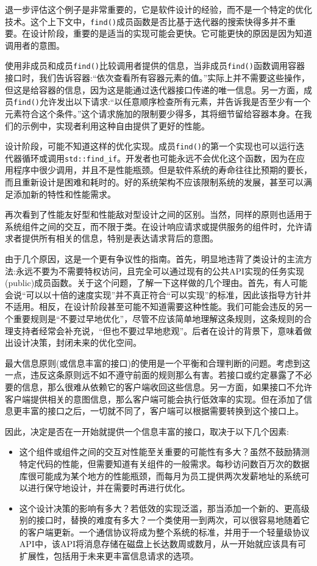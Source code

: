退一步评估这个例子是非常重要的，它是软件设计的经验，而不是一个特定的优化技术。这个上下文中，\texttt{find()}成员函数是否比基于迭代器的搜索快得多并不重要。在设计阶段，重要的是适当的实现可能会更快。它可能更快的原因是因为知道调用者的意图。 

使用非成员和成员\texttt{find()}比较调用者提供的信息，当非成员\texttt{find()}函数调用容器接口时，我们告诉容器:“依次查看所有容器元素的值。”实际上并不需要这些操作，但这是给容器的信息，因为这是能通过迭代器接口传递的唯一信息。另一方面，成员\texttt{find()}允许发出以下请求:“以任意顺序检查所有元素，并告诉我是否至少有一个元素符合这个条件。”这个请求施加的限制要少得多，其将细节留给容器本身。在我们的示例中，实现者利用这种自由提供了更好的性能。

设计阶段，可能不知道这样的优化实现。成员\texttt{find()}的第一个实现也可以运行迭代器循环或调用\texttt{std::find\_if}。开发者也可能永远不会优化这个函数，因为在应用程序中很少调用，并且不是性能瓶颈。但是软件系统的寿命往往比预期的要长，而且重新设计是困难和耗时的。好的系统架构不应该限制系统的发展，甚至可以满足添加新的特性和性能需求。

再次看到了性能友好型和性能敌对型设计之间的区别。当然，同样的原则也适用于系统组件之间的交互，而不限于类。在设计响应请求或提供服务的组件时，允许请求者提供所有相关的信息，特别是表达请求背后的意图。

由于几个原因，这是一个更有争议性的指南。首先，明显地违背了类设计的主流方法:永远不要为不需要特权访问，且完全可以通过现有的公共API实现的任务实现(public)成员函数。关于这个问题，了解一下这样做的几个理由。首先，有人可能会说“可以以十倍的速度实现”并不真正符合“可以实现”的标准，因此该指导方针并不适用。相反，在设计阶段甚至可能不知道需要这种性能。我们可能会违反的另一个重要规则是“不要过早地优化”，尽管不应该简单地理解这条规则，这条规则的合理支持者经常会补充说，“但也不要过早地悲观”。后者在设计的背景下，意味着做出设计决策，封闭未来的优化空间。

最大信息原则(或信息丰富的接口)的使用是一个平衡和合理判断的问题。考虑到这一点，违反这条原则远不如不遵守前面的规则那么有害。若接口或约定暴露了不必要的信息，那么很难从依赖它的客户端收回这些信息。另一方面，如果接口不允许客户端提供相关的意图信息，那么客户端可能会执行低效率的实现。但在添加了信息更丰富的接口之后，一切就不同了，客户端可以根据需要转换到这个接口上。

因此，决定是否在一开始就提供一个信息丰富的接口，取决于以下几个因素: 

\begin{itemize}
\item 
这个组件或组件之间的交互对性能至关重要的可能性有多大？虽然不鼓励猜测特定代码的性能，但需要知道有关组件的一般需求。每秒访问数百万次的数据库很可能成为某个地方的性能瓶颈，而每月为员工提供两次发薪地址的系统可以进行保守地设计，并在需要时再进行优化。

\item 
这个设计决策的影响有多大？若低效的实现泛滥，那当添加一个新的、更高级别的接口时，替换的难度有多大？一个类使用一到两次，可以很容易地随着它的客户端更新。一个通信协议将成为整个系统的标准，并用于一个轻量级协议API中，该API将消息存储在磁盘上长达数周或数月，从一开始就应该具有可扩展性，包括用于未来更丰富信息请求的选项。
\end{itemize}

